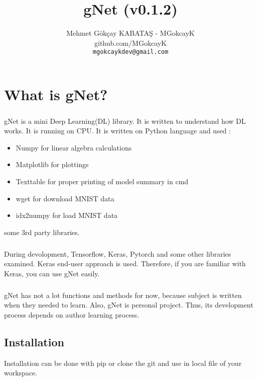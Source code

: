 \documentclass[12pt]{report}
\title {gNet (v0.1.2)}
\author{Mehmet Gökçay KABATAŞ - MGokcayK \\ github.com/MGokcayK \\ \texttt{mgokcaykdev@gmail.com}
}
\begin{document}
\maketitle
\tableofcontents





\chapter{What is gNet?}

\paragraph{}
gNet is a mini Deep Learning(DL) library. It is written to understand how DL works. It is running on CPU. It is written on Python language and used :

\begin{itemize}
	\item Numpy for linear algebra calculations
	\item Matplotlib for plottings
	\item Texttable for proper printing of model summary in cmd
	\item wget for download MNIST data
	\item idx2numpy for load MNIST data
\end{itemize}

some 3rd party libraries.

\paragraph{}
During devolopment, Tensorflow, Keras, Pytorch and some other libraries examined. Keras end-user approach is used. Therefore, if you are familiar with Keras, you can use gNet easily. 

\paragraph{}
gNet has not a lot functions and methods for now, because subject is written when they needed to learn. Also, gNet is personal project. Thus, its development process depends on author learning process.

\section{Installation}
Installation can be done with pip or clone the git and use in local file of your workspace.
\end{document}
